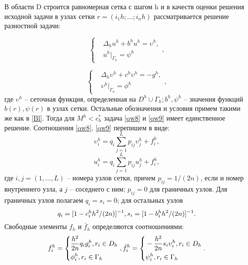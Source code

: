 В области D строится равномерная сетка с шагом h и в качеств
оценки решения исходной задачи в узлах сетки $r = (i_{1}h; \dots ; i_{n}h)$ рассматривается решение разностной задачи:

\begin{equation} 
	\left\{
\begin{aligned}
&\Delta_{h} u^{h} + b^{h}u^{h} =\upsilon^{h}, \\
&u^{h}|_{\Gamma_{h}} = \psi^{h}
\end{aligned}
 \right. ,\label{qw8}
\end{equation}

\begin{equation} 
	\left\{
\begin{aligned}
&\Delta_{h} \upsilon^{h} + c^{h}\upsilon^{h} =-g^{h},\\  & \upsilon^{h}|_{\Gamma_{h}} = \phi^{h}
\end{aligned}
 \right. ,\label{qw9}
\end{equation}
где $\upsilon^{h}$ -- сеточная функция, определенная на $D^{h} \cup \Gamma_{h}; b^{h}, \psi^{h}$ --  значения функций $b(r), \psi(r)$ в узлах сетки. Остальные обозначения и условия
примем такими же как в \ref{Bl}. Тогда для $M^{h} < c^{*}_{h}$  задача \ref{qw8} и \ref{qw9}
имеет единственное решение.
Соотношения \ref{qw8}, \ref{qw9} перепишем в виде:
\begin{equation}
	\upsilon^{h}_{i}=q_{i}\sum^{L}_{j=1}{p_{ij}\upsilon^{h}_{j}}+f^{h}_{i},
\end{equation}
\begin{equation}
	u^{h}_{i}=q_{i}\sum^{L}_{j=1}{p_{ij}u^{h}_{j}}+f^{h}_{i},
\end{equation}
где $i,j=(1,\dots,L)$ --  номера узлов сетки, причем $p_{ij}=1/(2n)$, если и 
номер внутреннего узла, а $j$ --  соседнего с ним; $p_{ij}= 0$ для граничных
узлов. Для граничных узлов полагаем $q_{i}=s_{i}=0$; для остальных узлов
\begin{equation}
	q_{i}=[1-c^{h}_{i}h^{2}/(2n)]^{-1} ,\\ s_{i}=[1-b^{h}_{i}h^{2}/(2n)]^{-1}.
\end{equation}
Свободные элементы $f_{h}$ и 
$\bar{f}_{h}$ определяются соотношениями:
\begin{equation}
	f^{h}_{i}= 
	\left\{
\begin{aligned}
& \frac{h^{2}}{2n}q_{i}g^{h}_{i}, r_{i} \in D_{h}\\ & \phi^{h}_{i}, r_{i} \in \Gamma_{h}
\end{aligned}
 \right. ,\\
\bar{f}^{h}_{i}= 
	\left\{
\begin{aligned}
& -\frac{h^{2}}{2n}s_{i}\upsilon^{h}_{i}, r_{i} \in D_{h}\\ & \psi^{h}_{i}, r_{i} \in \Gamma_{h}
\end{aligned}
 \right. .
\end{equation}
